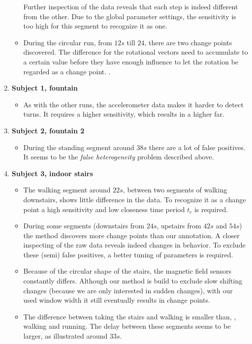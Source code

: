 \begin{enumerate}
\begin{itemize}
      Further inspection of the data reveals that each step is indeed different from the other.
      Due to the global parameter settings, the sensitivity is too high for this segment to recognize it as one.
      \item During the circular run, from $12s$ till $24$, there are two change points discovered.
      The difference for the rotational vectors need to accumulate to a certain value before they have enough influence to let the rotation be regarded as a change point.
      .
    \end{itemize}
  \item \textbf{Subject 1, fountain}
    \begin{itemize}
      \item As with the other runs, the accelerometer data makes it harder to detect turns.
      It requires a higher sensitivity, which results in a higher \gls{far}.
    \end{itemize}
  \item \textbf{Subject 2, fountain 2}
    \begin{itemize}
      \item During the standing segment around $38s$ there are a lot of false positives.
      It seems to be the \emph{false heterogeneity} problem described above.
    \end{itemize}
  \setcounter{enumi}{7}
  \item \textbf{Subject 3, indoor stairs}
    \begin{itemize}
      \item The walking segment around $22s$, between two segments of walking downstairs, shows little difference in the data.
      To recognize it as a change point a high sensitivity and low closeness time period $t_c$ is required.
      \item During some segments (downstairs from $24s$, upstairs from $42s$ and $54s$) the method discovers more change points than our annotation.
      A closer inspecting of the raw data reveals indeed changes in behavior.
      To exclude these (semi) false positives, a better tuning of parameters is required.
      \item Because of the circular shape of the stairs, the magnetic field sensors constantly differs.
      Although our method is build to exclude slow shifting changes (because we are only interested in sudden changes), with our used window width it still eventually results in change points.
      \item The difference between taking the stairs and walking is smaller than, \eg, walking and running.
      The delay between these segments seems to be larger, as illustrated around $33s$.
    \end{itemize}
\end{enumerate}

